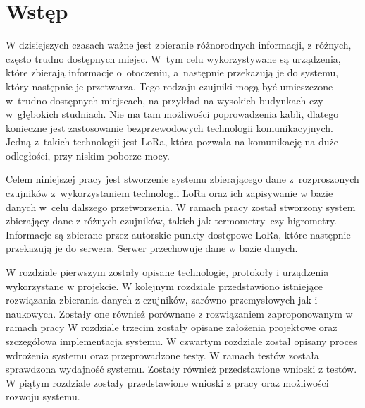 
\chapter*{Wstęp} %
W dzisiejszych czasach ważne jest zbieranie różnorodnych informacji, z różnych, często trudno dostępnych miejsc. W~tym celu wykorzystywane są urządzenia, które zbierają informacje o~otoczeniu, a~następnie przekazują je do systemu, który następnie je przetwarza. Tego rodzaju czujniki mogą być umieszczone w~trudno dostępnych miejscach, na przykład na wysokich budynkach czy w~głębokich studniach. Nie ma tam możliwości poprowadzenia kabli, dlatego konieczne jest zastosowanie bezprzewodowych technologii komunikacyjnych. Jedną z~takich technologii jest LoRa, która pozwala na komunikację na duże odległości, przy niskim poborze mocy.

Celem niniejszej pracy jest stworzenie systemu zbierającego dane z~rozproszonych czujników z~wykorzystaniem technologii LoRa oraz ich zapisywanie w bazie danych w~celu dalszego przetworzenia.
W ramach pracy został stworzony system zbierający dane z różnych czujników, takich jak termometry~czy higrometry.
Informacje są zbierane przez autorskie punkty dostępowe LoRa, które następnie przekazują je do serwera.
Serwer przechowuje dane w bazie danych.

W rozdziale pierwszym zostały opisane technologie, protokoły i urządzenia wykorzystane w projekcie.
W kolejnym rozdziale przedstawiono istniejące rozwiązania zbierania danych z czujników, zarówno przemysłowych jak i naukowych. Zostały one również porównane z rozwiązaniem zaproponowanym w ramach pracy
W rozdziale trzecim zostały opisane założenia projektowe oraz szczegółowa implementacja systemu.
W czwartym rozdziale został opisany proces wdrożenia systemu oraz przeprowadzone testy. W ramach testów została sprawdzona wydajność systemu. Zostały również przedstawione wnioski z testów.
W piątym rozdziale zostały przedstawione wnioski z pracy oraz możliwości rozwoju systemu.
